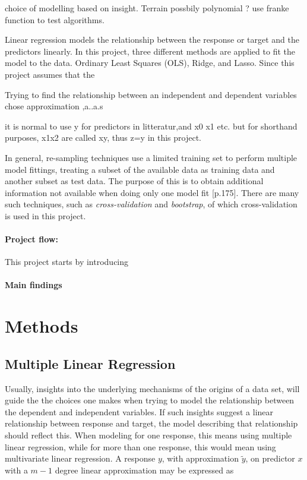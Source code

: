 \documentclass[%
oneside,                 %
final,                   %
10pt]{article}
\begin{document}
choice of modelling based on insight. Terrain possbily polynomial ? use franke function to test algorithms. 

Linear regression models the relationship between the response or target and the predictors linearly. In this project, three different methods are applied to fit the model to the data. Ordinary Least Squares (OLS), Ridge, and Lasso. Since this project assumes that the 

 Trying to find the relationship between an independent and dependent variables chose approximation ,a..a.s

it is normal to use y for predictors in litteratur,and x0 x1 etc. but for shorthand purposes, x1x2 are called xy, thus z=y in this project.

In general, re-sampling techniques use a limited training set to perform multiple model fittings, treating a subset of the available data as training data and another subset as test data. The purpose of this is to obtain additional information not available when doing only one model fit \citep{2017introstatlearn}[p.175]. There are many such techniques, such as \textit{cross-validation} and \textit{bootstrap}, of which cross-validation is used in this project.
\paragraph{Project flow:} This project starts by introducing 
\paragraph{Main findings}


\section{Methods}
\subsection{Multiple Linear Regression}
Usually, insights into the underlying mechanisms of the origins of a data set, will guide the the choices one makes when trying to model the relationship between the dependent and independent variables. If such insights suggest a linear relationship between response and target, the model describing that relationship should reflect this. When modeling for one response, this means using multiple linear regression, while for more than one response, this would mean using multivariate linear regression. A response $y$, with approximation $\tilde{y}$, on predictor $x$ with a $m-1$ degree linear approximation may be expressed as
\end{document}
